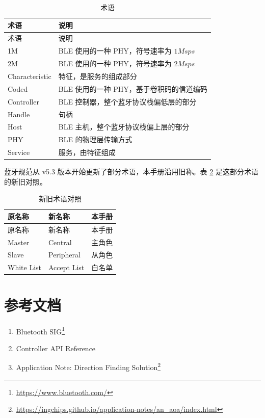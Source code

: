 \documentclass[
  12pt,
]{book}
\providecommand{\tightlist}{%
  \setlength{\itemsep}{0pt}\setlength{\parskip}{0pt}}
\begin{document}
\begin{longtable}[]{@{}ll@{}}
\caption{\label{tab:ch0-term} 术语}\tabularnewline
\toprule()
术语 & 说明 \\
\midrule()
\endfirsthead
\toprule()
术语 & 说明 \\
\midrule()
\endhead
1M & BLE 使用的一种 PHY，符号速率为 \(1Msps\) \\
2M & BLE 使用的一种 PHY，符号速率为 \(2Msps\) \\
Characteristic & 特征，是服务的组成部分 \\
Coded & BLE 使用的一种 PHY，基于卷积码的信道编码 \\
Controller & BLE 控制器，整个蓝牙协议栈偏低层的部分 \\
Handle & 句柄 \\
Host & BLE 主机，整个蓝牙协议栈偏上层的部分 \\
PHY & BLE 的物理层传输方式 \\
Service & 服务，由特征组成 \\
\bottomrule()
\end{longtable}

蓝牙规范从 v5.3 版本开始更新了部分术语，本手册沿用旧称。表 \ref{tab:ch0-new-term} 是这部分术语的新旧对照。

\begin{longtable}[]{@{}lll@{}}
\caption{\label{tab:ch0-new-term} 新旧术语对照}\tabularnewline
\toprule()
原名称 & 新名称 & 本手册 \\
\midrule()
\endfirsthead
\toprule()
原名称 & 新名称 & 本手册 \\
\midrule()
\endhead
Master & Central & 主角色 \\
Slave & Peripheral & 从角色 \\
White List & Accept List & 白名单 \\
\bottomrule()
\end{longtable}

\hypertarget{ux53c2ux8003ux6587ux6863}{%
\section{参考文档}\label{ux53c2ux8003ux6587ux6863}}

\begin{enumerate}
\def\labelenumi{\arabic{enumi}.}
\tightlist
\item
  Bluetooth SIG\footnote{\url{https://www.bluetooth.com/}}
\item
  Controller API Reference
\item
  Application Note: Direction Finding Solution\footnote{\url{https://ingchips.github.io/application-notes/an_aoa/index.html}}
\end{enumerate}
\end{document}
